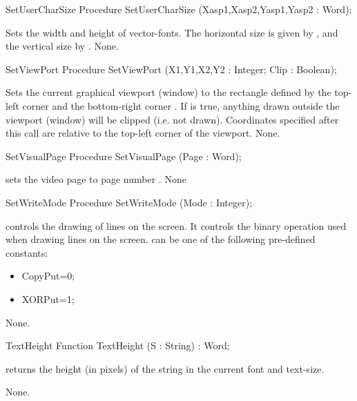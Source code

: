 \begin{procedure}{SetUserCharSize}
\Declaration
Procedure SetUserCharSize (Xasp1,Xasp2,Yasp1,Yasp2 : Word);

\Description
Sets the width and height of vector-fonts. The horizontal size is given
by , and the vertical size by .
\Errors
None.
\SeeAlso
{}
\end{procedure}

\begin{procedure}{SetViewPort}
\Declaration
Procedure SetViewPort (X1,Y1,X2,Y2 : Integer; Clip : Boolean);

\Description
Sets the current graphical viewport (window) to the rectangle defined by
the top-left corner  and the bottom-right corner .
If  is true, anything drawn outside the viewport (window) will be
clipped (i.e. not drawn). Coordinates specified after this call are relative
to the top-left corner of the viewport.
\Errors
None.
\SeeAlso
{}
\end{procedure}

\begin{procedure}{SetVisualPage}
\Declaration
Procedure SetVisualPage (Page : Word);

\Description
{} sets the video page to page number . 
\Errors
None
\SeeAlso
{}
\end{procedure}

\begin{procedure}{SetWriteMode}
\Declaration
Procedure SetWriteMode (Mode : Integer);

\Description
{} controls the drawing of lines on the screen. It controls
the binary operation used when drawing lines on the screen.  can
be one of the following pre-defined constants:

\begin{itemize}
\item CopyPut=0;
\item XORPut=1;
\end{itemize}
\Errors
None.
\SeeAlso

\end{procedure}

\begin{function}{TextHeight}
\Declaration
Function TextHeight (S : String) : Word;

\Description
{} returns the height (in pixels) of the string  in
the current font and text-size.

\Errors
None.
\SeeAlso
{}
\end{function}

